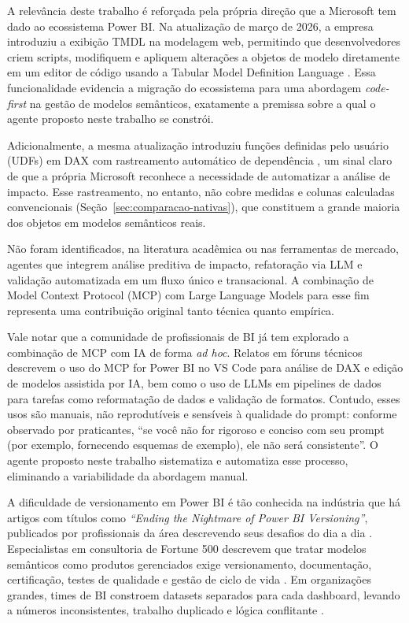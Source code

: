 \documentclass[
    12pt,               %
    openright,          %
    oneside,            %
    a4paper,            %
    chapter=TITLE,      %
    section=TITLE,      %
    brazil              %
]{abntex2}
\begin{document}
A relevância deste trabalho é reforçada pela própria direção que a Microsoft tem dado ao ecossistema Power BI. Na atualização de março de 2026, a empresa introduziu a exibição TMDL na modelagem web, permitindo que desenvolvedores criem scripts, modifiquem e apliquem alterações a objetos de modelo diretamente em um editor de código usando a Tabular Model Definition Language \cite{microsoft2026pbimarco}. Essa funcionalidade evidencia a migração do ecossistema para uma abordagem \textit{code-first} na gestão de modelos semânticos, exatamente a premissa sobre a qual o agente proposto neste trabalho se constrói.

Adicionalmente, a mesma atualização introduziu funções definidas pelo usuário (UDFs) em DAX com rastreamento automático de dependência \cite{microsoft2026daxudf}, um sinal claro de que a própria Microsoft reconhece a necessidade de automatizar a análise de impacto. Esse rastreamento, no entanto, não cobre medidas e colunas calculadas convencionais (Seção~\ref{sec:comparacao-nativas}), que constituem a grande maioria dos objetos em modelos semânticos reais.

Não foram identificados, na literatura acadêmica ou nas ferramentas de mercado, agentes que integrem análise preditiva de impacto, refatoração via LLM e validação automatizada em um fluxo único e transacional. A combinação de Model Context Protocol (MCP) com Large Language Models para esse fim representa uma contribuição original tanto técnica quanto empírica.

Vale notar que a comunidade de profissionais de BI já tem explorado a combinação de MCP com IA de forma \textit{ad hoc}. Relatos em fóruns técnicos descrevem o uso do MCP for Power BI no VS Code para análise de DAX e edição de modelos assistida por IA, bem como o uso de LLMs em pipelines de dados para tarefas como reformatação de dados e validação de formatos. Contudo, esses usos são manuais, não reprodutíveis e sensíveis à qualidade do prompt: conforme observado por praticantes, ``se você não for rigoroso e conciso com seu prompt (por exemplo, fornecendo esquemas de exemplo), ele não será consistente''. O agente proposto neste trabalho sistematiza e automatiza esse processo, eliminando a variabilidade da abordagem manual.

A dificuldade de versionamento em Power BI é tão conhecida na indústria que há artigos com títulos como \textit{``Ending the Nightmare of Power BI Versioning''}, publicados por profissionais da área descrevendo seus desafios do dia a dia \cite{plotnikov2024versioning}. Especialistas em consultoria de Fortune 500 descrevem que tratar modelos semânticos como produtos gerenciados exige versionamento, documentação, certificação, testes de qualidade e gestão de ciclo de vida \cite{powerbiconsulting2026bestpractices}. Em organizações grandes, times de BI constroem datasets separados para cada dashboard, levando a números inconsistentes, trabalho duplicado e lógica conflitante \cite{codecreators2024chaos}.
\end{document}
